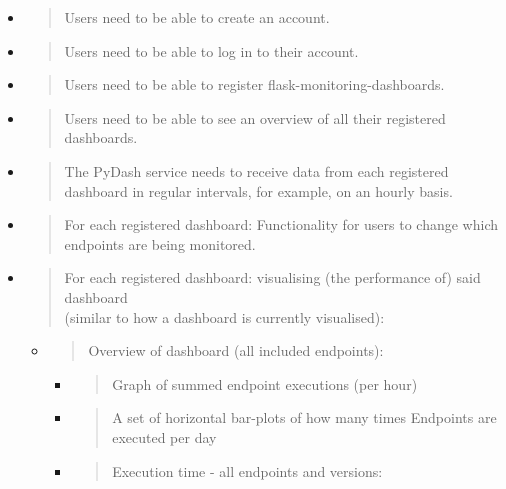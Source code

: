 \begin{itemize}
\item
  \begin{quote}
  Users need to be able to create an account.
  \end{quote}
\item
  \begin{quote}
  Users need to be able to log in to their account.
  \end{quote}
\item
  \begin{quote}
  Users need to be able to register flask-monitoring-dashboards.
  \end{quote}
\item
  \begin{quote}
  Users need to be able to see an overview of all their registered
  dashboards.
  \end{quote}
\item
  \begin{quote}
  The PyDash service needs to receive data from each registered
  dashboard in regular intervals, for example, on an hourly basis.
  \end{quote}
\item
  \begin{quote}
  For each registered dashboard: Functionality for users to change which
  endpoints are being monitored.
  \end{quote}
\item
  \begin{quote}
  For each registered dashboard: visualising (the performance of) said
  dashboard\\
  (similar to how a dashboard is currently visualised):
  \end{quote}

  \begin{itemize}
  \item
    \begin{quote}
    Overview of dashboard (all included endpoints):
    \end{quote}

    \begin{itemize}
    \item
      \begin{quote}
      Graph of summed endpoint executions (per hour)
      \end{quote}
    \item
      \begin{quote}
      A set of horizontal bar-plots of how many times Endpoints are
      executed per day
      \end{quote}
    \item
      \begin{quote}
      Execution time - all endpoints and versions:
      \end{quote}


\end{itemize}
\end{itemize}
\end{itemize}
